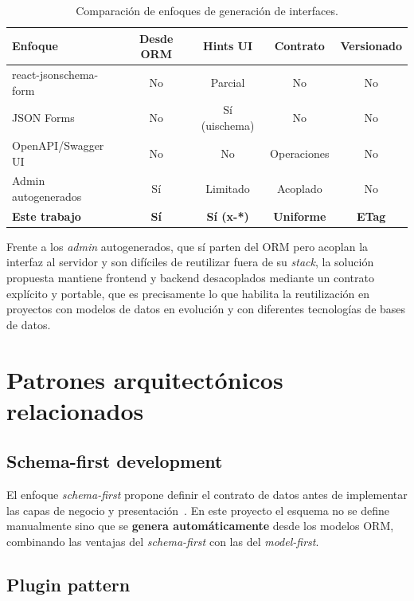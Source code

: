 \begin{table}[!htbp]
\caption{Comparación de enfoques de generación de interfaces.}
\label{tab:soa}
\centering
\begin{tabular}{|p{3.4cm}|c|c|c|c|}
\hline
\textbf{Enfoque} & \textbf{Desde ORM} & \textbf{Hints UI} &
\textbf{Contrato} & \textbf{Versionado} \\ \hline
react-jsonschema-form & No & Parcial & No & No \\ \hline
JSON Forms & No & Sí (uischema) & No & No \\ \hline
OpenAPI/Swagger UI & No & No & Operaciones & No \\ \hline
Admin autogenerados & Sí & Limitado & Acoplado & No \\ \hline
\textbf{Este trabajo} & \textbf{Sí} & \textbf{Sí (x-*)} &
\textbf{Uniforme} & \textbf{ETag} \\ \hline
\end{tabular}
\end{table}

Frente a los \emph{admin} autogenerados, que sí
parten del ORM pero acoplan la interfaz al servidor y son difíciles de
reutilizar fuera de su \emph{stack}, la solución propuesta mantiene frontend y
backend desacoplados mediante un contrato explícito y portable, que es
precisamente lo que habilita la reutilización en proyectos con modelos de
datos en evolución y con diferentes tecnologías de bases de datos.

\section{Patrones arquitectónicos relacionados}
\label{sec:patrones}

\subsection{Schema-first development}
\label{subsec:schema-first}

El enfoque \textit{schema-first} propone definir el contrato de datos antes de implementar
las capas de negocio y presentación~\cite{schemafirst}. En este proyecto el esquema no se
define manualmente sino que se \textbf{genera automáticamente} desde los modelos ORM,
combinando las ventajas del \textit{schema-first} con las del \textit{model-first}.

\subsection{Plugin pattern}
\label{subsec:plugin-pattern}

